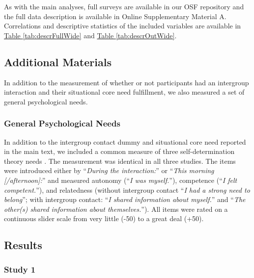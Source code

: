 \documentclass[man, 12pt, a4paper, mask]{apa7}
\theoremstyle{break}
\theoremstyle{plain}
\newcommand{\tblref}[2][]{\hyperref[#2]{Table \ref*{#2}#1}}
\begin{document}
As with the main analyses, full surveys are available in our OSF
repository \citep{KreienkampMasked2022a} and the full data description
is available in Online Supplementary Material A. Correlations and
descriptive statistics of the included variables are available in
\tblref{tab:descrFullWide} and \tblref{tab:descrOutWide}.

\subsection{Additional Materials}

In addition to the measurement of whether or not participants had an
intergroup interaction and their situational core need fulfillment, we
also measured a set of general psychological needs.

\subsubsection{General Psychological Needs}

In addition to the intergroup contact dummy and situational core need
reported in the main text, we included a common measure of three
self-determination theory needs \citep[see][]{Downie2008}. The
measurement was identical in all three studies. The items were
introduced either by ``\textit{During the interaction:}'' or
``\textit{This morning [/afternoon]:}'' and measured autonomy
(``\textit{I was myself.}''), competence
(``\textit{I felt competent.}''), and relatedness (without intergroup
contact ``\textit{I had a strong need to belong}''; with intergroup
contact: ``\textit{I shared information about myself.}'' and
``\textit{The other(s) shared information about themselves.}''). All
items were rated on a continuous slider scale from very little (-50) to
a great deal (+50).

\subsection{Results}

\subsubsection{Study 1}
\end{document}
